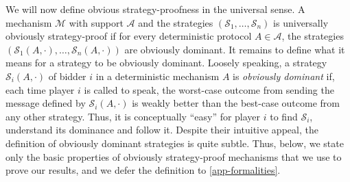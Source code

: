 We will now define obvious strategy-proofness in the universal sense. A mechanism $\mathcal M$ with support $\mathcal A$ and the strategies $(\mathcal S_1,\ldots,\mathcal S_n)$ is universally obviously strategy-proof if for every deterministic protocol $A\in \mathcal A$,
the strategies $(\mathcal S_1(A,\cdot),\ldots,\mathcal S_n(A,\cdot))$ are obviously dominant. 
It remains to define what it means for a strategy to be obviously dominant. Loosely speaking, a strategy 
$\mathcal S_i(A,\cdot)$
of bidder $i$ in a deterministic mechanism $A$ is \emph{obviously dominant} if,
each time player $i$ is called to speak, the worst-case outcome from sending the message defined by 
$\mathcal S_i(A,\cdot)$ 
is weakly better than the best-case outcome from any other strategy.
Thus, it is conceptually ``easy'' for player $i$ to find $\mathcal{S}_i$, understand its dominance and follow it. Despite their intuitive appeal, the definition of obviously
dominant strategies is quite subtle. Thus, 
below, we state only the basic properties of obviously strategy-proof mechanisms that we use to prove our results, and 
we defer the  definition to 
\cref{app-formalities}.













